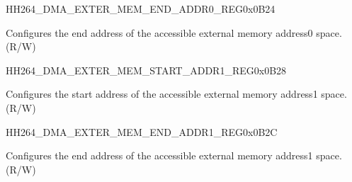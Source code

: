     
    \begin{register}{H}{H264\_DMA\_EXTER\_MEM\_END\_ADDR0\_REG}{0x0B24}\label{regdesc:H264DMAEXTERMEMENDADDR0REG}
    \regnewline%
    \begin{regdesc}\begin{reglist}
    \label{fielddesc:H264DMAACCESSEXTERMEMENDADDR0}\item [H264\_DMA\_ACCESS\_EXTER\_MEM\_END\_ADDR0] Configures the end address of the accessible external memory address0 space. (R/W)
    \end{reglist}\end{regdesc}
    \end{register}
    
    
    \begin{register}{H}{H264\_DMA\_EXTER\_MEM\_START\_ADDR1\_REG}{0x0B28}\label{regdesc:H264DMAEXTERMEMSTARTADDR1REG}
    \regnewline%
    \begin{regdesc}\begin{reglist}
    \label{fielddesc:H264DMAACCESSEXTERMEMSTARTADDR1}\item [H264\_DMA\_ACCESS\_EXTER\_MEM\_START\_ADDR1] Configures the start address of the accessible external memory address1 space. (R/W)
    \end{reglist}\end{regdesc}
    \end{register}
    
    
    \begin{register}{H}{H264\_DMA\_EXTER\_MEM\_END\_ADDR1\_REG}{0x0B2C}\label{regdesc:H264DMAEXTERMEMENDADDR1REG}
    \regnewline%
    \begin{regdesc}\begin{reglist}
    \label{fielddesc:H264DMAACCESSEXTERMEMENDADDR1}\item [H264\_DMA\_ACCESS\_EXTER\_MEM\_END\_ADDR1] Configures the end address of the accessible external memory address1 space. (R/W)
    \end{reglist}\end{regdesc}
    \end{register}
    

